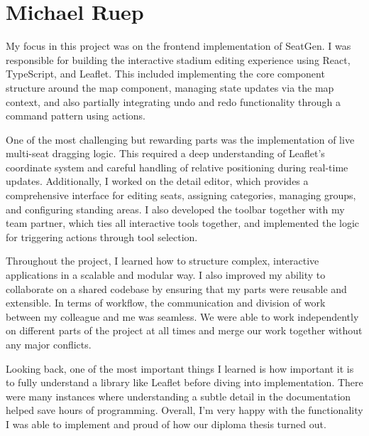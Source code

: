 \section{Michael Ruep}

My focus in this project was on the frontend implementation of SeatGen. I was responsible for building the interactive stadium editing experience using React, TypeScript, and Leaflet. This included implementing the core component structure around the map component, managing state updates via the map context, and also partially integrating undo and redo functionality through a command pattern using actions.

One of the most challenging but rewarding parts was the implementation of live multi-seat dragging logic. This required a deep understanding of Leaflet’s coordinate system and careful handling of relative positioning during real-time updates. Additionally, I worked on the detail editor, which provides a comprehensive interface for editing seats, assigning categories, managing groups, and configuring standing areas. I also developed the toolbar together with my team partner, which ties all interactive tools together, and implemented the logic for triggering actions through tool selection.

Throughout the project, I learned how to structure complex, interactive applications in a scalable and modular way. I also improved my ability to collaborate on a shared codebase by ensuring that my parts were reusable and extensible. In terms of workflow, the communication and division of work between my colleague and me was seamless. We were able to work independently on different parts of the project at all times and merge our work together without any major conflicts.

Looking back, one of the most important things I learned is how important it is to fully understand a library like Leaflet before diving into implementation. There were many instances where understanding a subtle detail in the documentation helped save hours of programming. Overall, I’m very happy with the functionality I was able to implement and proud of how our diploma thesis turned out.

